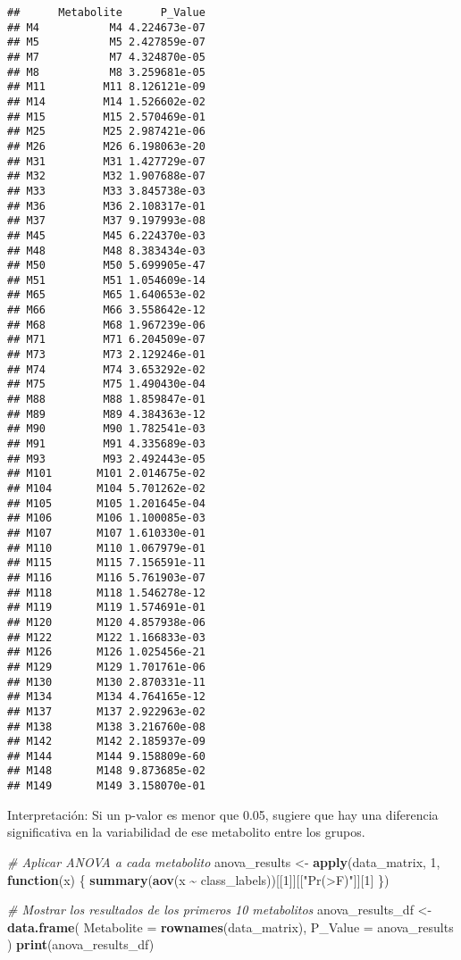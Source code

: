 \documentclass[
]{article}
\newenvironment{Shaded}{\begin{snugshade}}{\end{snugshade}}
\newcommand{\AttributeTok}[1]{\textcolor[rgb]{0.13,0.29,0.53}{#1}}
\newcommand{\CommentTok}[1]{\textcolor[rgb]{0.56,0.35,0.01}{\textit{#1}}}
\newcommand{\ControlFlowTok}[1]{\textcolor[rgb]{0.13,0.29,0.53}{\textbf{#1}}}
\newcommand{\DecValTok}[1]{\textcolor[rgb]{0.00,0.00,0.81}{#1}}
\newcommand{\FunctionTok}[1]{\textcolor[rgb]{0.13,0.29,0.53}{\textbf{#1}}}
\newcommand{\NormalTok}[1]{#1}
\newcommand{\OtherTok}[1]{\textcolor[rgb]{0.56,0.35,0.01}{#1}}
\newcommand{\SpecialCharTok}[1]{\textcolor[rgb]{0.81,0.36,0.00}{\textbf{#1}}}
\newcommand{\StringTok}[1]{\textcolor[rgb]{0.31,0.60,0.02}{#1}}
\begin{document}
\begin{verbatim}
##      Metabolite      P_Value
## M4           M4 4.224673e-07
## M5           M5 2.427859e-07
## M7           M7 4.324870e-05
## M8           M8 3.259681e-05
## M11         M11 8.126121e-09
## M14         M14 1.526602e-02
## M15         M15 2.570469e-01
## M25         M25 2.987421e-06
## M26         M26 6.198063e-20
## M31         M31 1.427729e-07
## M32         M32 1.907688e-07
## M33         M33 3.845738e-03
## M36         M36 2.108317e-01
## M37         M37 9.197993e-08
## M45         M45 6.224370e-03
## M48         M48 8.383434e-03
## M50         M50 5.699905e-47
## M51         M51 1.054609e-14
## M65         M65 1.640653e-02
## M66         M66 3.558642e-12
## M68         M68 1.967239e-06
## M71         M71 6.204509e-07
## M73         M73 2.129246e-01
## M74         M74 3.653292e-02
## M75         M75 1.490430e-04
## M88         M88 1.859847e-01
## M89         M89 4.384363e-12
## M90         M90 1.782541e-03
## M91         M91 4.335689e-03
## M93         M93 2.492443e-05
## M101       M101 2.014675e-02
## M104       M104 5.701262e-02
## M105       M105 1.201645e-04
## M106       M106 1.100085e-03
## M107       M107 1.610330e-01
## M110       M110 1.067979e-01
## M115       M115 7.156591e-11
## M116       M116 5.761903e-07
## M118       M118 1.546278e-12
## M119       M119 1.574691e-01
## M120       M120 4.857938e-06
## M122       M122 1.166833e-03
## M126       M126 1.025456e-21
## M129       M129 1.701761e-06
## M130       M130 2.870331e-11
## M134       M134 4.764165e-12
## M137       M137 2.922963e-02
## M138       M138 3.216760e-08
## M142       M142 2.185937e-09
## M144       M144 9.158809e-60
## M148       M148 9.873685e-02
## M149       M149 3.158070e-01
\end{verbatim}

Interpretación: Si un p-valor es menor que 0.05, sugiere que hay una
diferencia significativa en la variabilidad de ese metabolito entre los
grupos.

\begin{Shaded}
\begin{Highlighting}[]
\CommentTok{\# Aplicar ANOVA a cada metabolito}
\NormalTok{anova\_results }\OtherTok{\textless{}{-}} \FunctionTok{apply}\NormalTok{(data\_matrix, }\DecValTok{1}\NormalTok{, }\ControlFlowTok{function}\NormalTok{(x) \{}
  \FunctionTok{summary}\NormalTok{(}\FunctionTok{aov}\NormalTok{(x }\SpecialCharTok{\textasciitilde{}}\NormalTok{ class\_labels))[[}\DecValTok{1}\NormalTok{]][[}\StringTok{"Pr(\textgreater{}F)"}\NormalTok{]][}\DecValTok{1}\NormalTok{]}
\NormalTok{\})}

\CommentTok{\# Mostrar los resultados de los primeros 10 metabolitos}
\NormalTok{anova\_results\_df }\OtherTok{\textless{}{-}} \FunctionTok{data.frame}\NormalTok{(}
  \AttributeTok{Metabolite =} \FunctionTok{rownames}\NormalTok{(data\_matrix),}
  \AttributeTok{P\_Value =}\NormalTok{ anova\_results}
\NormalTok{)}
\FunctionTok{print}\NormalTok{(anova\_results\_df)}
\end{Highlighting}
\end{Shaded}
\end{document}
